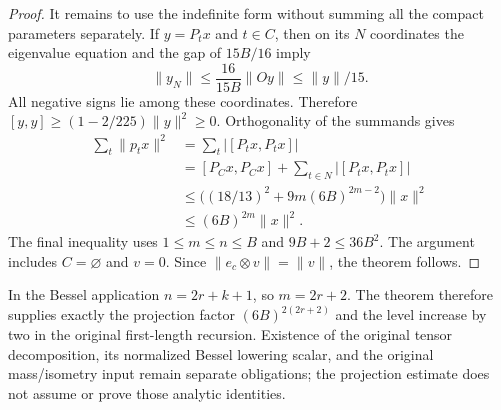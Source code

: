 \begin{proof}
It remains to use the indefinite form without summing all the compact
parameters separately.  If $y=P_tx$ and $t\in C$, then on its $N$
coordinates the eigenvalue equation and the gap of $15B/16$ imply
\[
        \|y_N\|\le\frac{16}{15B}\|Oy\|\le\|y\|/15.
\]
All negative signs lie among these coordinates.  Therefore
$[y,y]\ge(1-2/225)\|y\|^2\ge0$.  Orthogonality of the summands gives
\[
 \begin{split}
 \sum_t\|p_tx\|^2
 &=\sum_t|[P_tx,P_tx]|\\
 &=[P_Cx,P_Cx]+\sum_{t\in N}|[P_tx,P_tx]|\\
 &\le\bigl((18/13)^2+9m(6B)^{2m-2}\bigr)\|x\|^2\\
 &\le(6B)^{2m}\|x\|^2.
 \end{split}
\]
The final inequality uses $1\le m\le n\le B$ and
$9B+2\le36B^2$.  The argument includes $C=\varnothing$ and $v=0$.
Since $\|e_c\otimes v\|=\|v\|$, the theorem follows.
\end{proof}

In the Bessel application $n=2r+k+1$, so $m=2r+2$.  The theorem
therefore supplies exactly the projection factor
$(6B)^{2(2r+2)}$ and the level increase by two in the original
first-length recursion.  Existence of the original tensor
decomposition, its normalized Bessel lowering scalar, and the original
mass/isometry input remain separate obligations; the projection
estimate does not assume or prove those analytic identities.

